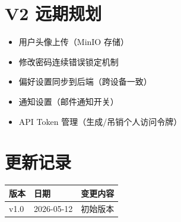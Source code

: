 \documentclass[11pt,a4paper]{article}
\begin{document}
\section{V2 远期规划}

\begin{itemize}[nosep]
  \item 用户头像上传（MinIO 存储）
  \item 修改密码连续错误锁定机制
  \item 偏好设置同步到后端（跨设备一致）
  \item 通知设置（邮件通知开关）
  \item API Token 管理（生成/吊销个人访问令牌）
\end{itemize}

\section*{更新记录}

\begin{tabular}{lll}
\toprule
版本 & 日期 & 变更内容 \\
\midrule
v1.0 & 2026-05-12 & 初始版本 \\
\bottomrule
\end{tabular}
\end{document}
